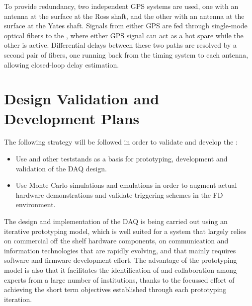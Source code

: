 To provide redundancy, two independent GPS systems are used,
one with an antenna at the surface at the Ross shaft, and the other
with an antenna at the surface at the Yates shaft. Signals from either
GPS are fed through single-mode optical fibers to the , where
either GPS signal can act as a hot spare while the other is active. 
Differential delays between these two paths are resolved by a second pair of fibers, one running back from the timing system to each antenna, allowing closed-loop delay estimation.


\section{Design Validation and Development Plans}
\label{sec:fd-daq:validation}

The following strategy will be followed in order to validate and
develop the   :
\begin{itemize}
\item Use  and other teststands as a basis for prototyping, development and validation
of the DAQ design.
\item Use Monte Carlo simulations and emulations in order to augment actual hardware
demonstrations and validate triggering schemes in the FD environment.
\end{itemize}


The design and implementation of the DAQ is being carried out using an iterative prototyping model, which is well suited for a system that largely relies on commercial off the shelf hardware components, on communication and information technologies that are rapidly evolving, and that mainly requires software and firmware development effort.
The advantage of the prototyping model is also that it facilitates the identification of and collaboration among experts from a large number of institutions, thanks to the focussed effort of achieving the short term objectives established through each prototyping iteration.

